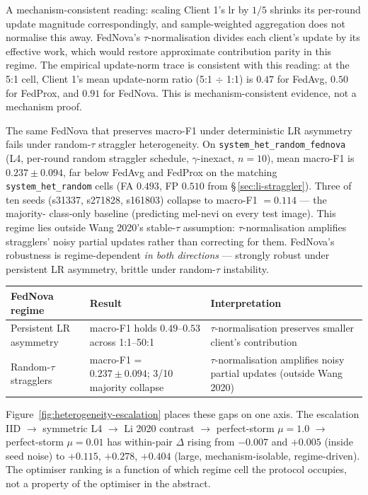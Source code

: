 \documentclass[11pt,a4paper]{report}
\begin{document}
A mechanism-consistent reading: scaling Client 1's $\textrm{lr}$ by $1/5$
shrinks its per-round update magnitude correspondingly, and sample-weighted
aggregation does not normalise this away. FedNova's $\tau$-normalisation
divides each client's update by its effective work, which would restore
approximate contribution parity in this regime. The empirical update-norm
trace is consistent with this reading: at the 5:1 cell, Client 1's mean
update-norm ratio (5:1 $\div$ 1:1) is $0.47$ for FedAvg, $0.50$ for FedProx,
and $0.91$ for FedNova. This is mechanism-consistent evidence, not a
mechanism proof.

The same FedNova that preserves macro-F1 under deterministic LR asymmetry
fails under random-$\tau$ straggler heterogeneity. On
\texttt{system\_het\_random\_fednova} (L4, per-round random straggler
schedule, $\gamma$-inexact, $n=10$), mean macro-F1 is $0.237 \pm 0.094$, far
below FedAvg and FedProx on the matching \texttt{system\_het\_random} cells
(FA $0.493$, FP $0.510$ from \S\,\ref{sec:li-straggler}). Three of ten seeds
(s31337, s271828, s161803) collapse to macro-F1 $= 0.114$ --- the majority-
class-only baseline (predicting mel-nevi on every test image). This regime
lies outside Wang 2020's stable-$\tau$ assumption: $\tau$-normalisation
amplifies stragglers' noisy partial updates rather than correcting for them.
FedNova's robustness is regime-dependent \emph{in both directions} ---
strongly robust under persistent LR asymmetry, brittle under random-$\tau$
instability.

\begin{center}
\begin{tabular}{lll}
\hline
FedNova regime              & Result                                   & Interpretation \\
\hline
Persistent LR asymmetry     & macro-F1 holds $0.49$--$0.53$ across 1:1--50:1 & $\tau$-normalisation preserves smaller client's contribution \\
Random-$\tau$ stragglers    & macro-F1 = $0.237 \pm 0.094$; 3/10 majority collapse & $\tau$-normalisation amplifies noisy partial updates (outside Wang 2020) \\
\hline
\end{tabular}
\end{center}

Figure~\ref{fig:heterogeneity-escalation} places these gaps on one axis.
The escalation IID $\to$ symmetric L4 $\to$ Li 2020 contrast $\to$
perfect-storm $\mu = 1.0$ $\to$ perfect-storm $\mu = 0.01$ has within-pair
$\Delta$ rising from $-0.007$ and $+0.005$ (inside seed noise) to $+0.115$,
$+0.278$, $+0.404$ (large, mechanism-isolable, regime-driven). The
optimiser ranking is a function of which regime cell the protocol occupies,
not a property of the optimiser in the abstract.
\end{document}
